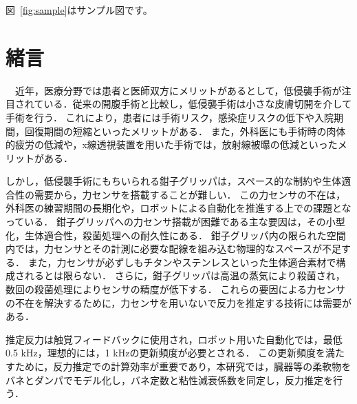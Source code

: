 \documentclass[a4paper]{jarticle}
\begin{document}
図~\ref{fig:sample}はサンプル図です。
\fi

\section{緒言}
　近年，医療分野では患者と医師双方にメリットがあるとして，低侵襲手術が注目されている\cite{MIS_ref1}．従来の開腹手術と比較し，低侵襲手術は小さな皮膚切開を介して手術を行う．
これにより，患者には手術リスク，感染症リスクの低下\cite{MIS_ref2}や入院期間\cite{MIS_ref3}，回復期間の短縮\cite{MIS_ref4}といったメリットがある．
また，外科医にも手術時の肉体的疲労の低減や，x線透視装置を用いた手術では，放射線被曝の低減といったメリットがある\cite{MIS_ref5}．

しかし，低侵襲手術にもちいられる鉗子グリッパは，スペース的な制約\cite{MIS_ref1}や生体適合性の需要\cite{MIS_ref6}から，力センサを搭載することが難しい．
この力センサの不在は，外科医の練習期間の長期化\cite{MIS_learning_time}や，ロボットによる自動化を推進する上での課題となっている\cite{RMIS}．
鉗子グリッパへの力センサ搭載が困難である主な要因は，その小型化，生体適合性，殺菌処理への耐久性にある\cite{MIS_ref7}．
鉗子グリッパ内の限られた空間内では，力センサとその計測に必要な配線を組み込む物理的なスペースが不足する\cite{MIS_ref1}．
また，力センサが必ずしもチタンやステンレスといった生体適合素材で構成されるとは限らない\cite{MIS_ref6}．
さらに，鉗子グリッパは高温の蒸気により殺菌され，数回の殺菌処理によりセンサの精度が低下する\cite{MIS_ref7}．
これらの要因による力センサの不在を解決するために，力センサを用いないで反力を推定する技術には需要がある．

 推定反力は触覚フィードバックに使用され，ロボット用いた自動化では，最低0.5 kHz\cite{fps_ref1}，理想的には，1 kHzの更新頻度が必要とされる\cite{fps_ref2}．
この更新頻度を満たすために，反力推定での計算効率が重要であり，本研究では，臓器等の柔軟物をバネとダンパでモデル化し，バネ定数と粘性減衰係数を同定し，反力推定を行う．

\end{document}
